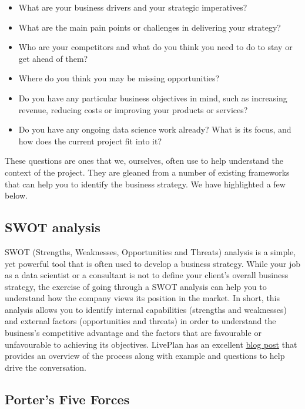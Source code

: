\documentclass[
]{book}
\providecommand{\tightlist}{%
  \setlength{\itemsep}{0pt}\setlength{\parskip}{0pt}}
\begin{document}
\begin{itemize}
\tightlist
\item
  What are your business drivers and your strategic imperatives?
\item
  What are the main pain points or challenges in delivering your
  strategy?
\item
  Who are your competitors and what do you think you need to do to stay
  or get ahead of them?
\item
  Where do you think you may be missing opportunities?
\item
  Do you have any particular business objectives in mind, such as
  increasing revenue, reducing costs or improving your products or
  services?
\item
  Do you have any ongoing data science work already? What is its focus,
  and how does the current project fit into it?
\end{itemize}

These questions are ones that we, ourselves, often use to help
understand the context of the project. They are gleaned from a number of
existing frameworks that can help you to identify the business strategy.
We have highlighted a few below.

\hypertarget{swot-analysis}{%
\subsection{SWOT analysis}\label{swot-analysis}}

SWOT (Strengths, Weaknesses, Opportunities and Threats) analysis is a
simple, yet powerful tool that is often used to develop a business
strategy. While your job as a data scientist or a consultant is not to
define your client's overall business strategy, the exercise of going
through a SWOT analysis can help you to understand how the company views
its position in the market. In short, this analysis allows you to
identify internal capabilities (strengths and weaknesses) and external
factors (opportunities and threats) in order to understand the
business's competitive advantage and the factors that are favourable or
unfavourable to achieving its objectives. LivePlan has an excellent
\href{https://www.liveplan.com/blog/what-is-a-swot-analysis-and-how-to-do-it-right-with-examples/}{blog
post} that provides an overview of the process along with example and
questions to help drive the conversation.

\hypertarget{porters-five-forces}{%
\subsection{Porter's Five Forces}\label{porters-five-forces}}
\end{document}
